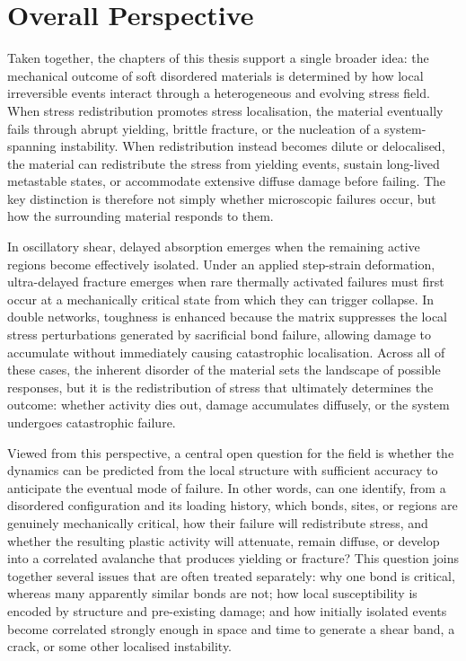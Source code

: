\section{Overall Perspective}
Taken together, the chapters of this thesis support a single broader idea: the mechanical outcome of soft disordered materials is determined by how local irreversible events interact through a heterogeneous and evolving stress field. When stress redistribution promotes stress localisation, the material eventually fails through abrupt yielding, brittle fracture, or the nucleation of a system-spanning instability. When redistribution instead becomes dilute or delocalised, the material can redistribute the stress from yielding events, sustain long-lived metastable states, or accommodate extensive diffuse damage before failing. The key distinction is therefore not simply whether microscopic failures occur, but how the surrounding material responds to them.

In oscillatory shear, delayed absorption emerges when the remaining active regions become effectively isolated. Under an applied step-strain deformation, ultra-delayed fracture emerges when rare thermally activated failures must first occur at a mechanically critical state from which they can trigger collapse. In double networks, toughness is enhanced because the matrix suppresses the local stress perturbations generated by sacrificial bond failure, allowing damage to accumulate without immediately causing catastrophic localisation. Across all of these cases, the inherent disorder of the material sets the landscape of possible responses, but it is the redistribution of stress that ultimately determines the outcome: whether activity dies out, damage accumulates diffusely, or the system undergoes catastrophic failure.

Viewed from this perspective, a central open question for the field is whether the dynamics can be predicted from the local structure with sufficient accuracy to anticipate the eventual mode of failure. In other words, can one identify, from a disordered configuration and its loading history, which bonds, sites, or regions are genuinely mechanically critical, how their failure will redistribute stress, and whether the resulting plastic activity will attenuate, remain diffuse, or develop into a correlated avalanche that produces yielding or fracture? This question joins together several issues that are often treated separately: why one bond is critical, whereas many apparently similar bonds are not; how local susceptibility is encoded by structure and pre-existing damage; and how initially isolated events become correlated strongly enough in space and time to generate a shear band, a crack, or some other localised instability. 

